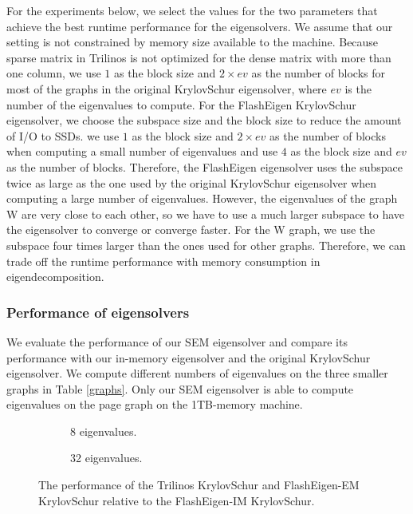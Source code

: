For the experiments below, we select the values for the two parameters that
achieve the best runtime performance for the eigensolvers. We assume that
our setting is not constrained by memory size available to the machine.
Because sparse matrix in Trilinos is not optimized for
the dense matrix with more than one column, we use $1$ as the block size and
$2 \times ev$ as the number of blocks for most of the graphs in the original
KrylovSchur eigensolver, where $ev$ is the number of the eigenvalues to compute.
For the FlashEigen KrylovSchur eigensolver, we choose the subspace size and
the block size to reduce the amount of I/O to SSDs. we use $1$ as the block size and
$2 \times ev$ as the number of blocks when computing a small number of eigenvalues
and use $4$ as the block size and $ev$ as the number of blocks. Therefore,
the FlashEigen eigensolver uses the subspace twice as large as the one used by
the original KrylovSchur eigensolver when computing a large number of eigenvalues.
However, the eigenvalues of the graph W are very close to each other, so we have
to use a much larger subspace to have the eigensolver to converge or converge
faster. For the W graph, we use the subspace four times larger than the ones
used for other graphs. Therefore, we can trade off the runtime performance
with memory consumption in eigendecomposition.

\subsubsection{Performance of eigensolvers}

We evaluate the performance of our SEM eigensolver and compare its performance
with our in-memory eigensolver and the original KrylovSchur eigensolver.
We compute different numbers of eigenvalues on the three smaller graphs in
Table \ref{graphs}. Only our SEM eigensolver is able to compute eigenvalues
on the page graph on the 1TB-memory machine.

\begin{figure}[t]
\centering
\footnotesize
\vspace{-15pt}
\begin{subfigure}{.5\linewidth}
	
	\vspace{-15pt}
	\caption{8 eigenvalues.}
	\label{fig:eigen8}
\end{subfigure}%
\begin{subfigure}{.5\linewidth}
	
	\vspace{-15pt}
	\caption{32 eigenvalues.}
	\label{fig:eigen32}
\end{subfigure}
\caption{The performance of the Trilinos KrylovSchur and FlashEigen-EM
KrylovSchur relative to the FlashEigen-IM KrylovSchur.}
\vspace{-15pt}
\label{fig:eigen}
\end{figure}

